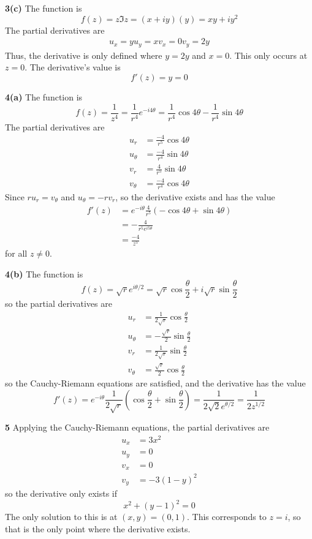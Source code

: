 \documentclass{article}
\begin{document}
\textbf{3(c)}
The function is
\[
	f(z) = z \Im z = (x + iy)(y) = xy + iy^2
\]
The partial derivatives are
\begin{align*}
	u_x = y
	u_y = x
	v_x = 0
	v_y = 2y
\end{align*}
Thus, the derivative is only defined where $y = 2y$ and $x = 0$. This only occurs at $z = 0$. The derivative's value is
\[
	f'(z) = y = 0
\]


\textbf{4(a)}
The function is
\[
	f(z) = \frac{1}{z^4} = \frac{1}{r^4} e^{-i4\theta}
	= \frac{1}{r^4} \cos 4\theta - \frac{1}{r^4} \sin 4\theta 
\]
The partial derivatives are
\begin{align*}
	u_r      &= \frac{-4}{r^5} \cos 4\theta \\
	u_\theta &= \frac{-4}{r^4} \sin 4\theta \\
	v_r      &= \frac{ 4}{r^5} \sin 4\theta \\
	v_\theta &= \frac{-4}{r^4} \cos 4\theta
\end{align*}
Since $ru_r = v_\theta$ and $u_\theta = -rv_r$, so the derivative exists and has the value
\begin{align*}
	f'(z) &= e^{-i\theta} \frac{4}{r^5} ( -\cos 4\theta + \sin 4\theta ) \\
	&= - \frac{4}{r^5 e^{i5\theta}} \\
	&= \frac{-4}{z^5}
\end{align*}
for all $z \neq 0$.

\textbf{4(b)}
The function is
\[
	f(z) = \sqrt{r} e^{i\theta / 2}
	= \sqrt{r} \cos \frac{\theta}{2} + i\sqrt{r} \sin \frac{\theta}{2}
\]
so the partial derivatives are
\begin{align*}
	u_r      &= \frac{1}{2\sqrt{r}} \cos \frac{\theta}{2} \\
	u_\theta &= -\frac{\sqrt{r}}{2} \sin \frac{\theta}{2} \\
	v_r      &= \frac{1}{2\sqrt{r}} \sin \frac{\theta}{2} \\
	v_\theta &=  \frac{\sqrt{r}}{2} \cos \frac{\theta}{2}
\end{align*}
so the Cauchy-Riemann equations are satisfied, and the derivative has the value
\[
	f'(z) = e^{-i\theta} \frac{1}{2\sqrt{r}} \left( \cos \frac{\theta}{2} + \sin \frac{\theta}{2} \right)
	= \frac{1}{2\sqrt{2} e^{\theta/2}}
	= \frac{1}{2z^{1/2}}
\]
	
\textbf{5}
Applying the Cauchy-Riemann equations, the partial derivatives are
\begin{align*}
	u_x &= 3x^2 \\
	u_y &= 0 \\
	v_x &= 0 \\
	v_y &= -3(1 - y)^2 
\end{align*}
so the derivative only exists if
\[
	x^2 + (y - 1)^2 = 0 
\]
The only solution to this is at $(x, y) = (0, 1)$. This corresponds to $z = i$, so that is the only point where the derivative exists.
\end{document}
